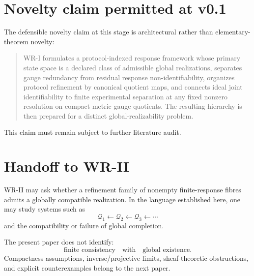 \documentclass[11pt]{article}
\begin{document}
\section{Novelty claim permitted at v0.1}

The defensible novelty claim at this stage is architectural rather than
elementary-theorem novelty:

\begin{quote}
WR-I formulates a protocol-indexed response framework whose primary state
space is a declared class of admissible global realizations, separates gauge
redundancy from residual response non-identifiability, organizes protocol
refinement by canonical quotient maps, and connects ideal joint
identifiability to finite experimental separation at any fixed nonzero
resolution on compact metric gauge quotients.  The resulting hierarchy is
then prepared for a distinct global-realizability problem.
\end{quote}

This claim must remain subject to further literature audit.

\section{Handoff to WR-II}

WR-II may ask whether a refinement family of nonempty finite-response fibres
admits a globally compatible realization.  In the language established here,
one may study systems such as
\[
\mathcal Q_1
\leftarrow
\mathcal Q_2
\leftarrow
\mathcal Q_3
\leftarrow\cdots
\]
and the compatibility or failure of global completion.

The present paper does not identify:
\[
\text{finite consistency}
\quad\text{with}\quad
\text{global existence}.
\]
Compactness assumptions, inverse/projective limits, sheaf-theoretic
obstructions, and explicit counterexamples belong to the next paper.
\end{document}
